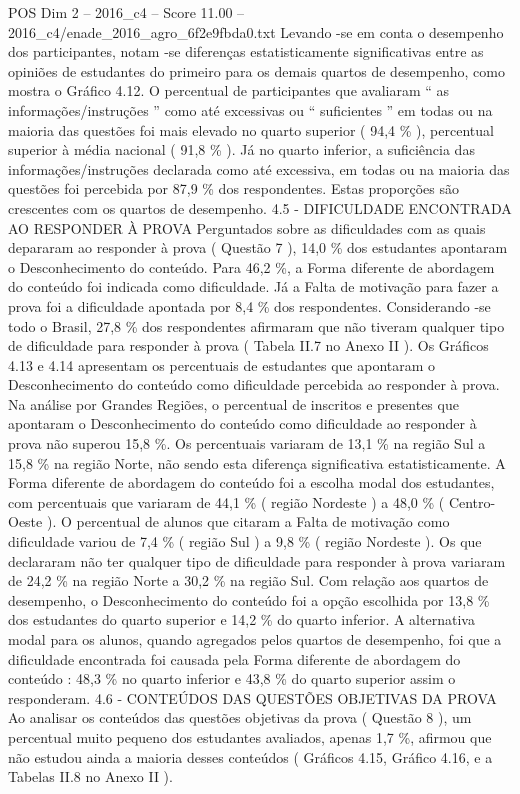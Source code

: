 \begin{textsample}{POS Dim 2 – 2016\_c4 – Score 11.00 – 2016\_c4/enade\_2016\_agro\_6f2e9fbda0.txt}
Levando -se em conta o desempenho dos participantes, notam -se diferenças estatisticamente significativas entre as opiniões de estudantes do primeiro para os demais quartos de desempenho, como mostra o Gráfico 4.12.
O percentual de participantes que avaliaram “ as informações/instruções ” como até excessivas ou “ suficientes ” em todas ou na maioria das questões foi mais elevado no quarto superior ( 94,4 \% ), percentual superior à média nacional ( 91,8 \% ).
Já no quarto inferior, a suficiência das informações/instruções declarada como até excessiva, em todas ou na maioria das questões foi percebida por 87,9 \% dos respondentes.
Estas proporções são crescentes com os quartos de desempenho. 4.5 - DIFICULDADE ENCONTRADA AO RESPONDER À PROVA Perguntados sobre as dificuldades com as quais depararam ao responder à prova ( Questão 7 ), 14,0 \% dos estudantes apontaram o Desconhecimento do conteúdo.
Para 46,2 \%, a Forma diferente de abordagem do conteúdo foi indicada como dificuldade.
Já a Falta de motivação para fazer a prova foi a dificuldade apontada por 8,4 \% dos respondentes.
Considerando -se todo o Brasil, 27,8 \% dos respondentes afirmaram que não tiveram qualquer tipo de dificuldade para responder à prova ( Tabela II.7 no Anexo II ).
Os Gráficos 4.13 e 4.14 apresentam os percentuais de estudantes que apontaram o Desconhecimento do conteúdo como dificuldade percebida ao responder à prova.
Na análise por Grandes Regiões, o percentual de inscritos e presentes que apontaram o Desconhecimento do conteúdo como dificuldade ao responder à prova não superou 15,8 \%.
Os percentuais variaram de 13,1 \% na região Sul a 15,8 \% na região Norte, não sendo esta diferença significativa estatisticamente.
A Forma diferente de abordagem do conteúdo foi a escolha modal dos estudantes, com percentuais que variaram de 44,1 \% ( região Nordeste ) a 48,0 \% ( Centro-Oeste ).
O percentual de alunos que citaram a Falta de motivação como dificuldade variou de 7,4 \% ( região Sul ) a 9,8 \% ( região Nordeste ).
Os que declararam não ter qualquer tipo de dificuldade para responder à prova variaram de 24,2 \% na região Norte a 30,2 \% na região Sul.
Com relação aos quartos de desempenho, o Desconhecimento do conteúdo foi a opção escolhida por 13,8 \% dos estudantes do quarto superior e 14,2 \% do quarto inferior.
A alternativa modal para os alunos, quando agregados pelos quartos de desempenho, foi que a dificuldade encontrada foi causada pela Forma diferente de abordagem do conteúdo : 48,3 \% no quarto inferior e 43,8 \% do quarto superior assim o responderam. 4.6 - CONTEÚDOS DAS QUESTÕES OBJETIVAS DA PROVA Ao analisar os conteúdos das questões objetivas da prova ( Questão 8 ), um percentual muito pequeno dos estudantes avaliados, apenas 1,7 \%, afirmou que não estudou ainda a maioria desses conteúdos ( Gráficos 4.15, Gráfico 4.16, e a Tabelas II.8 no Anexo II ).

\end{textsample}
